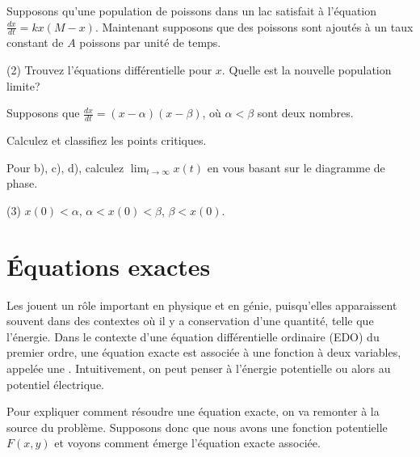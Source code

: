 \begin{exercise}
	Supposons qu'une population de poissons dans un lac satisfait à l'équation 	$\frac{dx}{dt} = kx(M-x)$.
	Maintenant supposons que des poissons sont ajoutés à un taux constant de $A$ poissons par unité de temps.
	\begin{tasks}(2)
		\task Trouvez l'équations différentielle pour $x$.
		\task Quelle est la nouvelle population limite?
	\end{tasks}
\end{exercise}

\begin{exercise}
	Supposons que $\frac{dx}{dt} = (x-\alpha)(x-\beta)$, où $\alpha <
	\beta$ sont deux nombres.
	\begin{tasks}
		\task Calculez et classifiez les points critiques.
	\end{tasks}
	Pour b), c), d), calculez $\displaystyle \lim_{t\to\infty} x(t)$ en vous basant sur le diagramme de phase.
	\begin{tasks}[resume](3)
		\task $x(0) < \alpha$,
		\task $\alpha < x(0) < \beta$,
		\task $\beta < x(0)$.
	\end{tasks}
\end{exercise}


\sectionnewpage
\section{Équations exactes}
\label{exact:section}

Les \emph{} jouent un rôle important en physique et en génie,
puisqu'elles apparaissent souvent dans des contextes où il y a conservation d'une quantité, telle que l'énergie.
Dans le contexte d'une équation différentielle ordinaire (EDO) du premier ordre, une équation exacte est associée à une fonction à deux variables,
appelée une \emph{}.
Intuitivement, on peut penser à l'énergie potentielle ou alors au potentiel électrique.

Pour expliquer comment résoudre une équation exacte, on va remonter à la source du problème.
Supposons donc que nous avons une fonction potentielle $F(x , y)$ et voyons comment émerge l'équation exacte associée.

